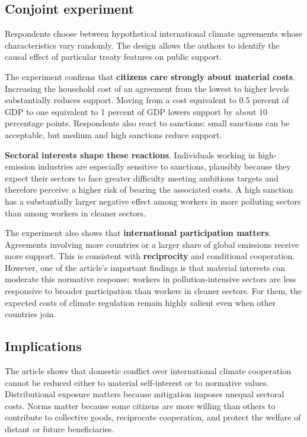 \subsection{Conjoint experiment}

Respondents choose between hypothetical international climate agreements whose characteristics vary randomly. The design allows the authors to identify the causal effect of particular treaty features on public support.

The experiment confirms that \textbf{citizens care strongly about material costs}. Increasing the household cost of an agreement from the lowest to higher levels substantially reduces support. Moving from a cost equivalent to 0.5 percent of GDP to one equivalent to 1 percent of GDP lowers support by about 10 percentage points. Respondents also react to sanctions: small sanctions can be acceptable, but medium and high sanctions reduce support.

\textbf{Sectoral interests shape these reactions}. Individuals working in high-emission industries are especially sensitive to sanctions, plausibly because they expect their sectors to face greater difficulty meeting ambitious targets and therefore perceive a higher risk of bearing the associated costs. A high sanction has a substantially larger negative effect among workers in more polluting sectors than among workers in cleaner sectors.

The experiment also shows that \textbf{international participation matters}. Agreements involving more countries or a larger share of global emissions receive more support. This is consistent with \textbf{reciprocity} and conditional cooperation. However, one of the article's important findings is that material interests can moderate this normative response: workers in pollution-intensive sectors are less responsive to broader participation than workers in cleaner sectors. For them, the expected costs of climate regulation remain highly salient even when other countries join.

\subsection{Implications}

The article shows that domestic conflict over international climate cooperation cannot be reduced either to material self-interest or to normative values. Distributional exposure matters because mitigation imposes unequal sectoral costs. Norms matter because some citizens are more willing than others to contribute to collective goods, reciprocate cooperation, and protect the welfare of distant or future beneficiaries.


